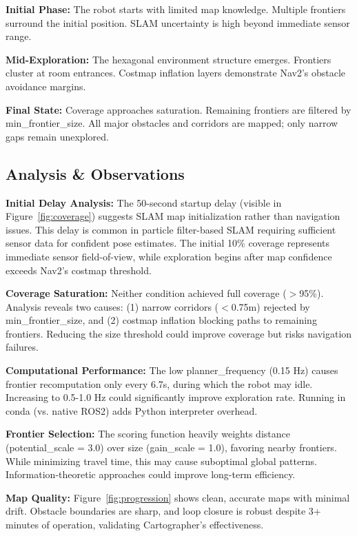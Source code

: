 \documentclass[conference]{IEEEtran}
\begin{document}
\textbf{Initial Phase:} The robot starts with limited map knowledge. Multiple frontiers surround the initial position. SLAM uncertainty is high beyond immediate sensor range.

\textbf{Mid-Exploration:} The hexagonal environment structure emerges. Frontiers cluster at room entrances. Costmap inflation layers demonstrate Nav2's obstacle avoidance margins.

\textbf{Final State:} Coverage approaches saturation. Remaining frontiers are filtered by min\_frontier\_size. All major obstacles and corridors are mapped; only narrow gaps remain unexplored.

\subsection{Analysis \& Observations}

\textbf{Initial Delay Analysis:} The 50-second startup delay (visible in Figure~\ref{fig:coverage}) suggests SLAM map initialization rather than navigation issues. This delay is common in particle filter-based SLAM requiring sufficient sensor data for confident pose estimates. The initial 10\% coverage represents immediate sensor field-of-view, while exploration begins after map confidence exceeds Nav2's costmap threshold.

\textbf{Coverage Saturation:} Neither condition achieved full coverage ($>$95\%). Analysis reveals two causes: (1) narrow corridors ($<$0.75m) rejected by min\_frontier\_size, and (2) costmap inflation blocking paths to remaining frontiers. Reducing the size threshold could improve coverage but risks navigation failures.

\textbf{Computational Performance:} The low planner\_frequency (0.15 Hz) causes frontier recomputation only every 6.7s, during which the robot may idle. Increasing to 0.5-1.0 Hz could significantly improve exploration rate. Running in conda (vs. native ROS2) adds Python interpreter overhead.

\textbf{Frontier Selection:} The scoring function heavily weights distance (potential\_scale = 3.0) over size (gain\_scale = 1.0), favoring nearby frontiers. While minimizing travel time, this may cause suboptimal global patterns. Information-theoretic approaches could improve long-term efficiency.

\textbf{Map Quality:} Figure~\ref{fig:progression} shows clean, accurate maps with minimal drift. Obstacle boundaries are sharp, and loop closure is robust despite 3+ minutes of operation, validating Cartographer's effectiveness.
\end{document}
